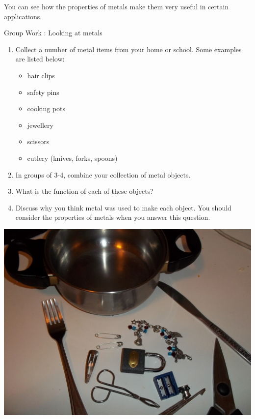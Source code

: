          \label{m38708*id65852}You can see how the properties of metals make them very useful in certain applications.\par 
\label{m38708*secfhsst!!!underscore!!!id320} \pagebreak
            \begin{activity}{Group Work : Looking at metals}{
            \nopagebreak
\begin{minipage}{0.5\textwidth}
        \label{m38708*id65869}\begin{enumerate}[noitemsep, label=\textbf{\arabic*}. ] 
            \label{m38708*uid83}\item Collect a number of metal items from your home or school. Some examples are listed below:
\label{m38708*id65885}\begin{itemize}[noitemsep]
            \label{m38708*uid84}\item hair clips
\label{m38708*uid85}\item safety pins
\label{m38708*uid86}\item cooking pots
\label{m38708*uid87}\item jewellery
\label{m38708*uid88}\item scissors
\label{m38708*uid89}\item cutlery (knives, forks, spoons)
\end{itemize}
        \label{m38708*uid90}\item In groups of 3-4, combine your collection of metal objects.
\label{m38708*uid91}\item What is the function of each of these objects?
\label{m38708*uid92}\item Discuss why you think metal was used to make each object. You should consider the properties of metals when you answer this question.
\end{enumerate}
\end{minipage}
\begin{minipage}{.5\textwidth}
\begin{center}
 \includegraphics[width=.8\textwidth]{photos/metal_objects.jpg}\par
\end{center}
\end{minipage}
}
\end{activity}
      \label{m38708*uid93}
